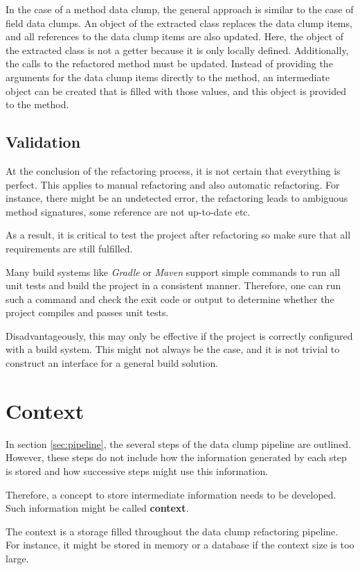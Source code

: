 In the case of a method data clump, the general approach is similar to the case of field data clumps. An object of the extracted class replaces the data clump items, and all references to the data clump items are also updated. Here, the object of the extracted class is not a getter because it is only locally defined. Additionally, the calls to the refactored method must be updated. Instead of providing the arguments for the data clump items directly to the method, an intermediate object can be created that is filled with those values, and this object is provided to the method. 

\subsection{Validation}

At the conclusion of the refactoring process, it is not certain that everything is perfect. This applies to manual refactoring and also automatic refactoring. For instance, there might be an undetected error, the refactoring leads to ambiguous method signatures, some reference are not up-to-date etc.

As a result, it is critical to test the project after refactoring so make sure that all requirements are still fulfilled.

Many build systems like \textit{Gradle} or \textit{Maven} support simple commands to run all unit tests and build the project in a consistent manner.  Therefore, one can run such a command and check the exit code or output to determine whether the project compiles and passes unit tests.

Disadvantageously, this may only be effective if the project is correctly configured with a build system. This might not always be the case, and it is not trivial to construct an interface for a general build solution. 


\section{Context}
In section \ref{sec:pipeline}, the several steps of the data clump pipeline are outlined. However, these steps do not include how the information generated by each step is stored and how successive steps might use this information.

Therefore, a concept to store intermediate information needs to be developed. Such information might be called \textbf{context}.

The context is a storage filled throughout the data clump refactoring pipeline. For instance, it might be stored in memory or a database if the context size is too large.

